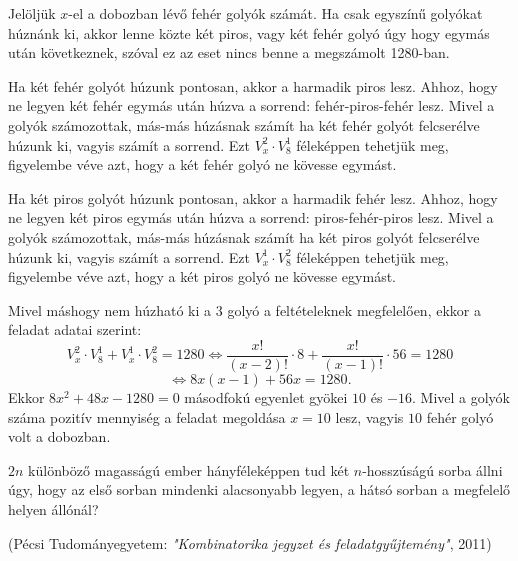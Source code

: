 \begin{solution}
Jelöljük $x$-el a dobozban lévő fehér golyók számát. Ha csak egyszínű
golyókat húznánk ki, akkor lenne közte két piros, vagy két fehér golyó
úgy hogy egymás után következnek, szóval ez az eset nincs benne a
megszámolt 1280-ban.

Ha két fehér golyót húzunk pontosan, akkor a harmadik piros lesz.
Ahhoz, hogy ne legyen két fehér egymás után húzva a sorrend: fehér-piros-fehér
lesz. Mivel a golyók számozottak, más-más húzásnak számít ha két fehér
golyót felcserélve húzunk ki, vagyis számít a sorrend. Ezt $V_{x}^{2}\cdot V_{8}^{1}$
féleképpen tehetjük meg, figyelembe véve azt, hogy a két fehér golyó
ne kövesse egymást.

Ha két piros golyót húzunk pontosan, akkor a harmadik fehér lesz.
Ahhoz, hogy ne legyen két piros egymás után húzva a sorrend: piros-fehér-piros
lesz. Mivel a golyók számozottak, más-más húzásnak számít ha két piros
golyót felcserélve húzunk ki, vagyis számít a sorrend. Ezt $V_{x}^{1}\cdot V_{8}^{2}$
féleképpen tehetjük meg, figyelembe véve azt, hogy a két piros golyó
ne kövesse egymást.

Mivel máshogy nem húzható ki a $3$ golyó a feltételeknek megfelelően,
ekkor a feladat adatai szerint: 
\[
V_{x}^{2}\cdot V_{8}^{1}+V_{x}^{1}\cdot V_{8}^{2}=1280\iff\frac{x!}{(x-2)!}\cdot8+\frac{x!}{(x-1)!}\cdot56=1280
\]
\[
\iff8x(x-1)+56x=1280.
\]
Ekkor $8x^{2}+48x-1280=0$ másodfokú egyenlet gyökei $10$ és $-16$.
Mivel a golyók száma pozitív mennyiség a feladat megoldása $x=10$
lesz, vagyis $10$ fehér golyó volt a dobozban. 
\end{solution}
\begin{extraproblem}
$2n$ különböző magasságú ember hányféleképpen tud két $n$-hosszúságú
sorba állni úgy, hogy az első sorban mindenki alacsonyabb legyen,
a hátsó sorban a megfelelő helyen állónál? 
\begin{flushright}
(Pécsi Tudományegyetem: \textit{"Kombinatorika jegyzet és feladatgyűjtemény"},
2011) 
\par\end{flushright}
\end{extraproblem}


